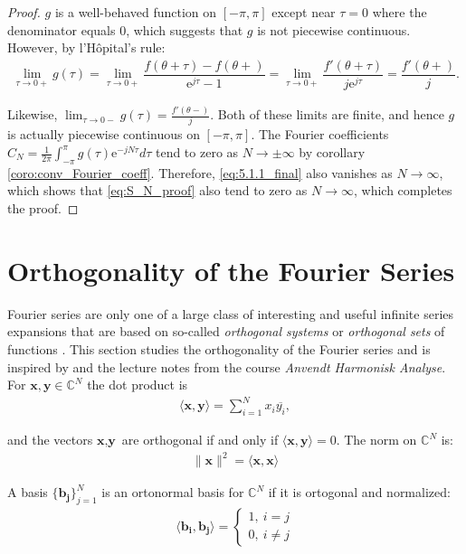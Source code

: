 \begin{proof}
	$g$ is a well-behaved function on $[-\pi,\pi]$ except near 		$\tau = 0$ where the denominator equals 0, which suggests 		that $g$ is not piecewise continuous. However, by 				l'Hôpital's rule:
	\begin{align*}
		\lim_{\tau \to 0+} g(\tau) = \lim_{\tau \to 0+} 				\dfrac{f(\theta + \tau) - f(\theta+)}{\text{e}^{j				\tau}-1} = \lim_{\tau \to 0+} \dfrac{f'(\theta + \tau)}			{j\text{e}^{j\tau}} = \dfrac{f'(\theta+)}{j}.
	\end{align*}
	
	Likewise, $\displaystyle{\lim_{\tau \to 0-}} g(\tau) = 			\frac{f'(\theta-)}{j}$. Both of these limits are finite, 		and hence $g$ is actually piecewise continuous on $[-\pi,		\pi]$. The Fourier coefficients $C_N = \frac{1}{2\pi} 			\int_{-\pi}^\pi g(\tau)\text{e}^{-jN\tau} d\tau$ tend to 		zero as $N 	\to \pm \infty$ by corollary 						\ref{coro:conv_Fourier_coeff}. 	Therefore,
	\eqref{eq:5.1.1_final} also vanishes as $N \to \infty$, 		which shows that \eqref{eq:S_N_proof} also tend to zero as 		$N \to \infty$, which completes the proof.
\end{proof}

\section{Orthogonality of the Fourier Series} \label{sec:FS_ort}
Fourier series are only one of a large class of interesting and useful infinite series expansions that are based on so-called \textit{orthogonal systems} or \textit{orthogonal sets} of functions \cite{page 62, FAA} . This section studies the orthogonality of the Fourier series and is inspired by \cite{pages 62-77, FAA} and the lecture notes from the course \textit{Anvendt Harmonisk Analyse}.
For $\textbf{x},\textbf{y} \in \mathbb{C}^N$ the dot product is
\begin{align*}
\langle \textbf{x},\textbf{y} \rangle = \sum_{i=1}^N x_i \overline{y_i},
\end{align*}

and the vectors $\textbf{x},\textbf{y}$ are orthogonal if and only if $\langle \textbf{x},\textbf{y} \rangle = 0$. The norm on $\mathbb{C}^N$ is:
\begin{align*}
\|\textbf{x}\|^2 = \langle \textbf{x},\textbf{x} \rangle
\end{align*}

A basis $\{\textbf{b}_\textbf{j}\}_{j=1}^N$ is an ortonormal basis for 
$\mathbb{C}^N$ if it is ortogonal and normalized:
\begin{align*}
\langle \textbf{b}_\textbf{i}, \textbf{b}_\textbf{j} \rangle =
\begin{cases}
	1, \ i = j \\
	0, \ i \neq j
\end{cases}
\end{align*}

